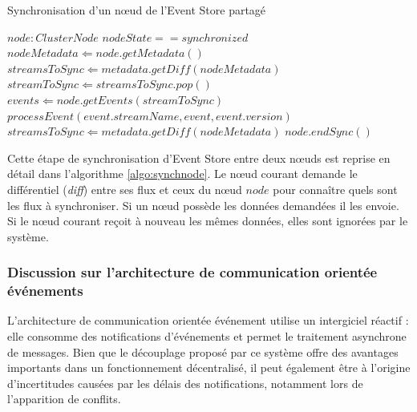 \begin{algorithm} %
	\caption{Synchronisation d'un n\oe ud de l'Event Store partagé} %
	\label{algo:synchnode} %
	\begin{algorithmic} %
		\Require $node : ClusterNode$
		\Ensure $nodeState == synchronized$
		\State $nodeMetadata \Leftarrow node.getMetadata()$
		\State $streamsToSync \Leftarrow metadata.getDiff(nodeMetadata)$
		\State $streamToSync \Leftarrow streamsToSync.pop()$
		\State $events \Leftarrow  node.getEvents(streamToSync)$
		\State $processEvent(event.streamName, event, 
		event.version)$
		\EndFor 
		\EndIf
		\State $streamsToSync \Leftarrow metadata.getDiff(nodeMetadata)$
		\EndWhile
		\EndIf
		\State $node.endSync()$
	\end{algorithmic}
\end{algorithm}

Cette étape de synchronisation d'Event Store entre deux n\oe uds est reprise en 
détail dans l'algorithme \ref{algo:synchnode}. Le n\oe ud courant demande le 
différentiel (\textit{diff}) entre ses flux et ceux du n\oe ud $node$ pour 
connaître quels sont les flux à synchroniser. Si un n\oe ud possède les données 
demandées il les envoie. Si le n\oe ud courant reçoit à nouveau les mêmes 
données, elles sont ignorées par le système.




%
%

\subsubsection{Discussion sur l'architecture de communication \og orientée  
événements\fg{}}

L'architecture de communication orientée événement utilise un intergiciel réactif : 
elle consomme des notifications d'événements et permet le traitement asynchrone 
de messages. Bien que le découplage proposé par ce système offre des 
avantages importants dans un fonctionnement décentralisé, il peut également 
être à l'origine d'incertitudes causées par les 
délais des notifications, notamment lors de l'apparition de conflits.

